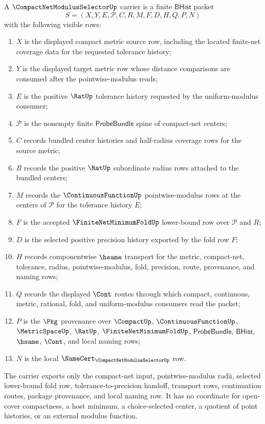 \begin{definition}
\label{def:compact-net-modulus-selector-carrier}
A $\CompactNetModulusSelectorUp$ carrier is a finite $\mathsf{BHist}$ packet
$$
S=(X,Y,E,\mathcal{P},C,R,M,F,D,H,Q,P,N)
$$
with the following visible rows:
\begin{enumerate}
\item $X$ is the displayed compact metric source row, including the located finite-net coverage data for the requested tolerance history;
\item $Y$ is the displayed target metric row whose distance comparisons are consumed after the pointwise-modulus reads;
\item $E$ is the positive $\RatUp$ tolerance history requested by the uniform-modulus consumer;
\item $\mathcal{P}$ is the nonempty finite $\mathsf{ProbeBundle}$ spine of compact-net centers;
\item $C$ records bundled center histories and half-radius coverage rows for the source metric;
\item $R$ records the positive $\RatUp$ subordinate radius rows attached to the bundled centers;
\item $M$ records the $\ContinuousFunctionUp$ pointwise-modulus rows at the centers of $\mathcal{P}$ for the tolerance history $E$;
\item $F$ is the accepted $\FiniteNetMinimumFoldUp$ lower-bound row over $\mathcal{P}$ and $R$;
\item $D$ is the selected positive precision history exported by the fold row $F$;
\item $H$ records componentwise $\hsame$ transport for the metric, compact-net, tolerance, radius, pointwise-modulus, fold, precision, route, provenance, and naming rows;
\item $Q$ records the displayed $\Cont$ routes through which compact, continuous, metric, rational, fold, and uniform-modulus consumers read the packet;
\item $P$ is the $\Pkg$ provenance over $\CompactUp$, $\ContinuousFunctionUp$, $\MetricSpaceUp$, $\RatUp$, $\FiniteNetMinimumFoldUp$, $\mathsf{ProbeBundle}$, $\mathsf{BHist}$, $\hsame$, $\Cont$, and local naming rows;
\item $N$ is the local $\NameCert_{\CompactNetModulusSelectorUp}$ row.
\end{enumerate}
The carrier exports only the compact-net input, pointwise-modulus radii, selected lower-bound fold row, tolerance-to-precision handoff, transport rows, continuation routes, package provenance, and local naming row. It has no coordinate for open-cover compactness, a host minimum, a choice-selected center, a quotient of point histories, or an external modulus function.
\end{definition}

